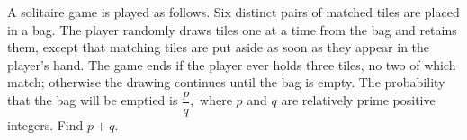 A solitaire game is played as follows.  Six distinct pairs of matched tiles are placed in a bag.  The player randomly draws tiles one at a time from the bag and retains them, except that matching tiles are put aside as soon as they appear in the player's hand.  The game ends if the player ever holds three tiles, no two of which match; otherwise the drawing continues until the bag is empty.  The probability that the bag will be emptied is $\dfrac{p}{q},$ where $p$ and $q$ are relatively prime positive integers.  Find $p+q.$
